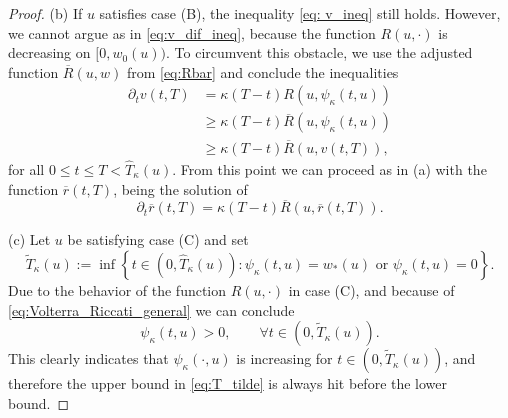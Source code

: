\documentclass[12pt,a4paper]{amsart}
\numberwithin{equation}{section}
\numberwithin{equation}{section}
\theoremstyle{nonumberplain}
\begin{document}
\begin{proof}
(b) If $u$ satisfies case (B), the inequality \eqref{eq: v_ineq} still holds. However, we cannot argue as in \eqref{eq:v_dif_ineq}, because the function $R(u,\cdot)$ is decreasing on $[0,w_0(u))$. To circumvent this obstacle, we use the adjusted function $\overline R(u,w)$ from \eqref{eq:Rbar} and conclude the inequalities
\begin{align*}
	\partial_t v(t,T) &= \kappa(T-t) R(u,\psi_\kappa(t,u)) \\
	&\ge \kappa(T-t) \overline R(u,\psi_\kappa(t,u)) \\
	&\ge \kappa(T-t) \overline R(u,v(t,T)),
\end{align*}
for all $0\le t \le T < \hat{T}_\kappa(u)$. From this point we can proceed as in (a) with the function $ \overline r(t,T)$, being the solution of
\begin{equation*}
		\partial_t \overline r(t,T) = \kappa(T-t) \overline R(u, \overline r(t,T)).
\end{equation*}


(c) Let $u$ be satisfying case (C) and set
\begin{equation}\label{eq:T_tilde}
	\widetilde{T}_\kappa(u) := \inf \left\{ t \in \left(0,\hat{T}_\kappa(u)\right) : \psi_\kappa(t,u) = w_{*}(u) \text{ or } \psi_\kappa(t,u) = 0\right\}.
\end{equation}
Due to the behavior of the function $R(u,\cdot)$ in case (C), and because of \eqref{eq:Volterra_Riccati_general} we can conclude
\begin{equation}\label{eq:psi_alpha >0}
	\psi_\kappa(t,u) > 0, \qquad \forall t \in \left(0,\widetilde{T}_\kappa(u)\right).
\end{equation}
This clearly indicates that $\psi_\kappa(\cdot,u)$ is increasing for $t \in \left(0,\widetilde{T}_\kappa(u)\right)$, and therefore the upper bound in \eqref{eq:T_tilde} is always hit before the lower bound.


\end{proof}
\end{document}
